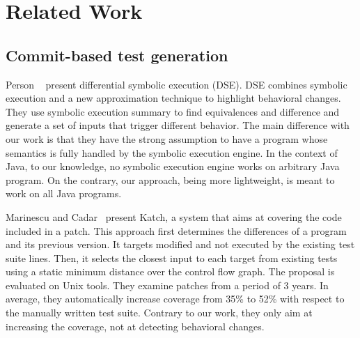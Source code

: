 
\section{Related Work}
\label{sec:related_work}

\subsection{Commit-based test generation}

Person \etal~\cite{dse} present differential symbolic execution (DSE). DSE combines symbolic execution and a new approximation technique to highlight behavioral changes.
They use symbolic execution summary to find equivalences and difference and generate a set of inputs that trigger different behavior.
The main difference with our work is that they have the strong assumption to have a program whose semantics is fully handled by the symbolic execution engine. 
In the context of Java, to our knowledge, no symbolic execution engine works on arbitrary Java program.
On the contrary, our approach, being more lightweight, is meant to work on all Java programs.

Marinescu and Cadar~\cite{marinescu2013katch} present Katch, a system that aims at covering the code included in a patch.
This approach first determines the differences of a program and its previous version.
It targets modified and not executed by the existing test suite lines.
Then, it selects the closest input to each target from existing tests using a static minimum distance over the control flow graph.
The proposal is evaluated on Unix tools. 
They examine patches from a period of 3 years. In average, they automatically increase coverage from 35\% to 52\% with respect to the manually written test suite.
Contrary to our work, they only aim at increasing the coverage, not at detecting behavioral changes.

